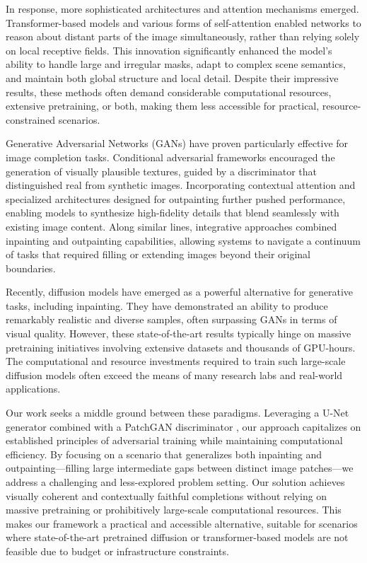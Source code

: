 \documentclass[sigconf]{acmart}
\begin{document}
In response, more sophisticated architectures and attention mechanisms emerged. Transformer-based models \cite{Dosovitskiy2020,Liu2021} and various forms of self-attention \cite{Jiahui2018,Dascoli2021} enabled networks to reason about distant parts of the image simultaneously, rather than relying solely on local receptive fields. This innovation significantly enhanced the model's ability to handle large and irregular masks, adapt to complex scene semantics, and maintain both global structure and local detail. Despite their impressive results, these methods often demand considerable computational resources, extensive pretraining, or both, making them less accessible for practical, resource-constrained scenarios.

Generative Adversarial Networks (GANs) have proven particularly effective for image completion tasks. Conditional adversarial frameworks \cite{Isola2017} encouraged the generation of visually plausible textures, guided by a discriminator that distinguished real from synthetic images. Incorporating contextual attention \cite{Yu2018} and specialized architectures designed for outpainting \cite{Yang2019} further pushed performance, enabling models to synthesize high-fidelity details that blend seamlessly with existing image content. Along similar lines, integrative approaches \cite{Lu2021} combined inpainting and outpainting capabilities, allowing systems to navigate a continuum of tasks that required filling or extending images beyond their original boundaries.

Recently, diffusion models \cite{Lugmayr2022,Rombach2022} have emerged as a powerful alternative for generative tasks, including inpainting. They have demonstrated an ability to produce remarkably realistic and diverse samples, often surpassing GANs in terms of visual quality. However, these state-of-the-art results typically hinge on massive pretraining initiatives involving extensive datasets and thousands of GPU-hours. The computational and resource investments required to train such large-scale diffusion models often exceed the means of many research labs and real-world applications.

Our work seeks a middle ground between these paradigms. Leveraging a U-Net generator \cite{Ronneberger2015} combined with a PatchGAN discriminator \cite{Isola2017}, our approach capitalizes on established principles of adversarial training while maintaining computational efficiency. By focusing on a scenario that generalizes both inpainting and outpainting—filling large intermediate gaps between distinct image patches—we address a challenging and less-explored problem setting. Our solution achieves visually coherent and contextually faithful completions without relying on massive pretraining or prohibitively large-scale computational resources. This makes our framework a practical and accessible alternative, suitable for scenarios where state-of-the-art pretrained diffusion or transformer-based models are not feasible due to budget or infrastructure constraints.
\end{document}

